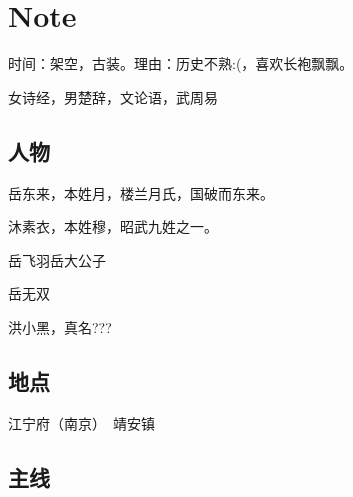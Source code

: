 
\chapter{Note}
\label{note}

时间：架空，古装。理由：历史不熟:(，喜欢长袍飘飘。

女诗经，男楚辞，文论语，武周易

\section{人物}
\label{sec:characters}


岳东来，本姓月，楼兰月氏，国破而东来。

沐素衣，本姓穆，昭武九姓之一。

岳飞羽岳大公子

岳无双

洪小黑，真名???

\section{地点}
\label{sec:place}

江宁府（南京）　靖安镇

\section{主线}
\label{sec:main-story}

